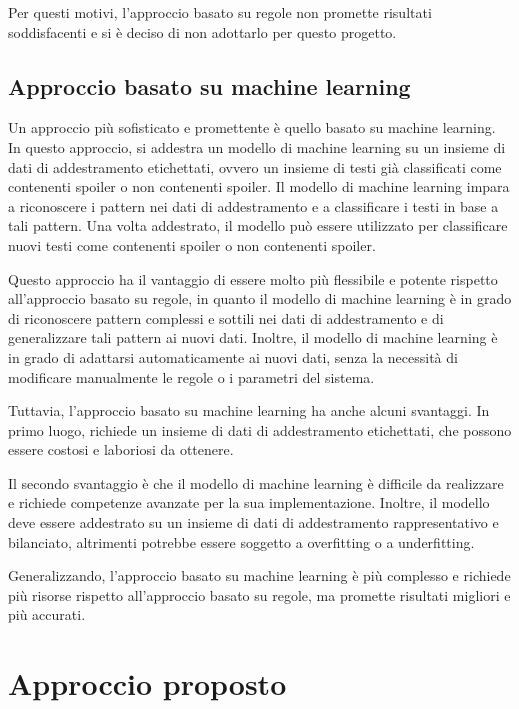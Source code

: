 Per questi motivi, l'approccio basato su regole non
promette risultati soddisfacenti e si è deciso di non
adottarlo per questo progetto.

\subsection{Approccio basato su machine learning}
\label{subsec:approccio-ml}

Un approccio più sofisticato e promettente è quello basato
su machine learning.
In questo approccio, si addestra un modello di machine
learning su un insieme di dati di addestramento
etichettati, ovvero un insieme di testi già classificati
come contenenti spoiler o non contenenti spoiler.
Il modello di machine learning impara a riconoscere i
pattern nei dati di addestramento e a classificare i testi
in base a tali pattern.
Una volta addestrato, il modello può essere utilizzato per
classificare nuovi testi come contenenti spoiler o non
contenenti spoiler.

Questo approccio ha il vantaggio di essere molto più
flessibile e potente rispetto all'approccio basato su
regole, in quanto il modello di machine learning è in grado
di riconoscere pattern complessi e sottili nei dati di
addestramento e di generalizzare tali pattern ai nuovi
dati.
Inoltre, il modello di machine learning è in grado di
adattarsi automaticamente ai nuovi dati, senza la necessità
di modificare manualmente le regole o i parametri del
sistema.

Tuttavia, l'approccio basato su machine learning ha anche
alcuni svantaggi.
In primo luogo, richiede un insieme di dati di
addestramento etichettati, che possono essere costosi e
laboriosi da ottenere.

Il secondo svantaggio è che il modello di machine learning
è difficile da realizzare e richiede competenze avanzate
per la sua implementazione.
Inoltre, il modello deve essere addestrato su un insieme di
dati di addestramento rappresentativo e bilanciato,
altrimenti potrebbe essere soggetto a overfitting o a
underfitting.

Generalizzando, l'approccio basato su machine learning è
più complesso e richiede più risorse rispetto all'approccio
basato su regole, ma promette risultati migliori e più
accurati.

\section{Approccio proposto}
\label{sec:approccio-proposto}

